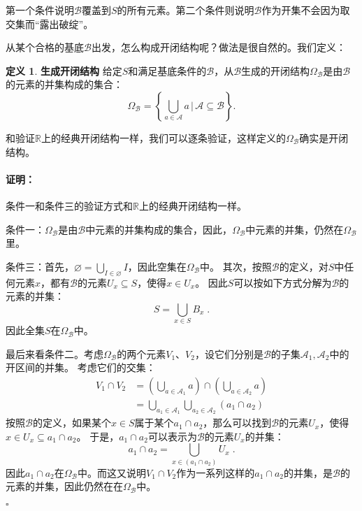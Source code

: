 \documentclass[12pt,UTF8]{ctexbook}
\theoremstyle{definition}
\newtheorem{df}{定义}[section]
\theoremstyle{plain}
\renewenvironment{proof}{\paragraph{\textbf{证明：}}}{\hfill$\square$}
\begin{document}
\begin{appendix}
第一个条件说明$\mathcal{B}$覆盖到$S$的所有元素。第二个条件则说明$\mathcal{B}$作为开集不会因为取交集而“露出破绽”。

从某个合格的基底$\mathcal{B}$出发，怎么构成开闭结构呢？做法是很自然的。我们定义：
\begin{df}{\textbf{生成开闭结构}}
    给定$S$和满足基底条件的$\mathcal{B}$，从$\mathcal{B}$生成的开闭结构$\Omega_{\mathcal{B}}$是由$\mathcal{B}$的元素的并集构成的集合：
    $$ \Omega_{\mathcal{B}} =\left\{\bigcup_{a \in \mathcal{A}} a \, \Bigg| \,\mathcal{A} \subseteq  \mathcal{B} \right\}.  $$
\end{df}

和验证$\mathbb{R}$上的经典开闭结构一样，我们可以逐条验证，这样定义的$\Omega_{\mathcal{B}}$确实是开闭结构。

\begin{proof}
    条件一和条件三的验证方式和$\mathbb{R}$上的经典开闭结构一样。

    条件一：$\Omega_{\mathcal{B}}$是由$\mathcal{B}$中元素的并集构成的集合，因此，$\Omega_{\mathcal{B}}$中元素的并集，仍然在$\Omega_{\mathcal{B}}$里。

    条件三：首先，$\varnothing = \bigcup_{I \in \varnothing} I $，因此空集在$\Omega_{\mathcal{B}}$中。
    其次，按照$\mathcal{B}$的定义，对$S$中任何元素$x$，都有$\mathcal{B}$的元素$U_x\subseteq S$，使得$x\in U_x$。
    因此$S$可以按如下方式分解为$\mathcal{B}$的元素的并集：
    $$ S = \bigcup_{x\in S} B_x \;. $$
    因此全集$S$在$\Omega_{\mathcal{B}}$中。

    最后来看条件二。考虑$\Omega_{\mathcal{B}}$的两个元素$V_1$、$V_2$，设它们分别是$\mathcal{B}$的子集$\mathcal{A}_1, \mathcal{A}_2$中的开区间的并集。
    考虑它们的交集：
    \begin{align*}
        V_1\cap V_2 &= \left(\bigcup_{a \in \mathcal{A}_1} a\right) \cap \left(\bigcup_{a \in \mathcal{A}_2} a\right) \\
        &= \bigcup_{a_1 \in \mathcal{A}_1} \bigcup_{a_2 \in \mathcal{A}_2} (a_1 \cap a_2)   
    \end{align*}
    按照$\mathcal{B}$的定义，如果某个$x\in S$属于某个$a_1 \cap a_2$，那么可以找到$\mathcal{B}$的元素$U_x$，使得$x\in U_x \subseteq a_1\cap a_2$。
    于是，$a_1 \cap a_2$可以表示为$\mathcal{B}$的元素$U_x$的并集：
    $$ a_1 \cap a_2 = \bigcup_{x\in (a_1 \cap a_2)} U_x \;. $$
    因此$a_1 \cap a_2$在$\Omega_{\mathcal{B}}$中。而这又说明$V_1\cap V_2$作为一系列这样的$a_1 \cap a_2$的并集，是$\mathcal{B}$的元素的并集，因此仍然在在$\Omega_{\mathcal{B}}$中。

\end{proof}


\end{appendix}
\end{document}
